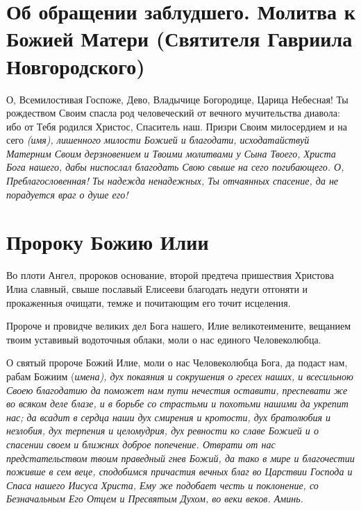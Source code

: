 \section{Об обращении заблудшего.  Молитва к Божией Матери  (Святителя Гавриила Новгородского)}\begin{mymulticols}


О, Всемилостивая Госпоже, Дево, Владычице Богородице, Царица Небесная! Ты рождеством Своим спасла род человеческий от вечного мучительства диавола: ибо от Тебя родился Христос, Спаситель наш. Призри Своим милосердием и на сего \itshape (имя)\normalfont{}, лишенного милости Божией и благодати, исходатайствуй Матерним Своим дерзновением и Твоими молитвами у Сына Твоего, Христа Бога нашего, дабы ниспослал благодать Свою свыше на сего погибающего. О, Преблагословенная! Ты надежда ненадежных, Ты отчаянных спасение, да не порадуется враг о душе его! 

\end{mymulticols}

\mychapterending


 

\section{Пророку Божию Илии}\begin{mymulticols}
 


Во плоти Ангел, пророков основание, второй предтеча пришествия Христова Илиа славный, свыше пославый Елисееви благодать недуги отгоняти и прокаженныя очищати, темже и почитающим его точит исцеления.


Пророче и провидче великих дел Бога нашего, Илие великотеимените, вещанием твоим уставивый водоточныя облаки, моли о нас единого Человеколюбца.


О святый пророче Божий Илие, моли о нас Человеколюбца Бога, да подаст нам, рабам Божиим (\itshape имена\normalfont{}), дух покаяния и сокрушения о гресех наших, и всесильною Своею благодатию да поможет нам пути нечестия оставити, преспевати же во всяком деле блазе, и в борьбе со страстьми и похотьми нашими да укрепит нас; да всадит в сердца наши дух смирения и кротости, дух братолюбия и незлобия, дух терпения и целомудрия, дух ревности ко славе Божией и о спасении своем и ближних доброе попечение. Отврати от нас предстательством твоим праведный гнев Божий, да тако в мире и благочестии поживше в сем веце, сподобимся причастия вечных благ во Царствии Господа и Спаса нашего Иисуса Христа, Ему же подобает честь и поклонение, со Безначальным Его Отцем и Пресвятым Духом, во веки веков. Аминь.

\end{mymulticols}

